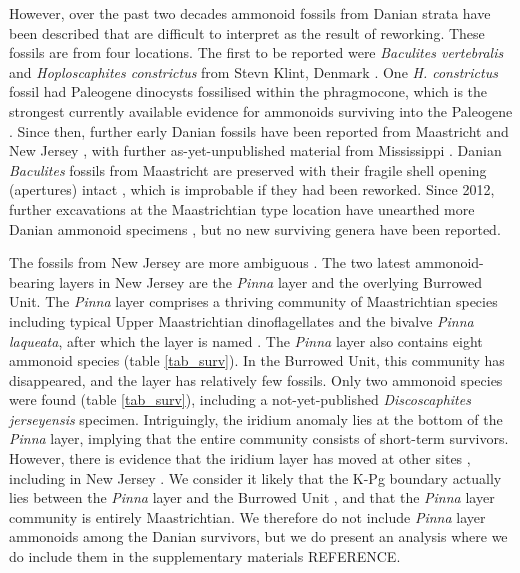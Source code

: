 \documentclass[a4paper]{article}
\begin{document}
However, over the past two decades ammonoid fossils from Danian strata have been described that are difficult to interpret as the result of reworking. These fossils are from four locations. The first to be reported were \textit{Baculites vertebralis} and \textit{Hoploscaphites constrictus} from Stevn Klint, Denmark \parencite{machalskiEvidenceAmmoniteSurvival2005}. One \textit{H. constrictus} fossil had Paleogene dinocysts fossilised within the phragmocone, which is the strongest currently available evidence for ammonoids surviving into the Paleogene \parencite{machalskiEvidenceAmmoniteSurvival2005}. Since then, further early Danian fossils have been reported from Maastricht \parencite{vellekoopTypeMaastrichtianGastropodFaunas2020, jagtAmmonietenUitHet2012, jagt2003early} and New Jersey \parencite{landmanShortTermSurvivalAmmonites2012}, with further as-yet-unpublished material from Mississippi \parencite{barrera-cuencaAmmoniteJawsCretaceous2024,landmanAmmonitesCretaceousPaleogeneSites2024}. Danian \textit{Baculites} fossils from Maastricht are preserved with their fragile shell opening (apertures) intact \parencite{jagt2003early}, which is improbable if they had been reworked. Since 2012, further excavations at the Maastrichtian type location have unearthed more Danian ammonoid specimens \parencite{vellekoopTypeMaastrichtianGastropodFaunas2020}, but no new surviving genera have been reported. 

The fossils from New Jersey are more ambiguous \parencite{landmanShortTermSurvivalAmmonites2012}. The two latest ammonoid-bearing layers in New Jersey are the \textit{Pinna} layer and the overlying Burrowed Unit. The \textit{Pinna} layer comprises a thriving community of Maastrichtian species including typical Upper Maastrichtian dinoflagellates and the bivalve \textit{Pinna laqueata}, after which the layer is named \parencite{landmanShortTermSurvivalAmmonites2012}. The \textit{Pinna} layer also contains eight ammonoid species (table \ref{tab_surv}). In the Burrowed Unit, this community has disappeared, and the layer has relatively few fossils. Only two ammonoid species were found (table \ref{tab_surv}), including a not-yet-published \textit{Discoscaphites jerseyensis} specimen. Intriguingly, the iridium anomaly lies at the bottom of the \textit{Pinna} layer, implying that the entire community consists of short-term survivors. However, there is evidence that the iridium layer has moved at other sites \parencite{rackiWeatheringModifiedIridiumRecord2011}, including in New Jersey \parencite{olssonEjectaLayerCretaceousTertiary1997}. We consider it likely that the K-Pg boundary actually lies between the \textit{Pinna} layer and the Burrowed Unit \parencite{millerRelationshipMassExtinction2010, landmanShortTermSurvivalAmmonites2012}, and that the \textit{Pinna} layer community is entirely Maastrichtian. We therefore do not include  \textit{Pinna} layer ammonoids among the Danian survivors, but we do present an analysis where we do include them in the supplementary materials REFERENCE.  
\end{document}
